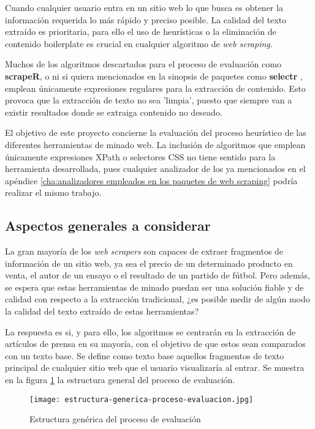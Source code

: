 Cuando cualquier usuario entra en un sitio web lo que busca es obtener la información requerida lo más
rápido y preciso posible. La calidad del texto extraído es prioritaria, para ello el uso de heurísticas o
la eliminación de contenido boilerplate es crucial en cualquier algoritmo de \emph{web scraping}.

Muchos de los algoritmos descartados para el proceso de evaluación como \textbf{scrapeR}, o ni si quiera 
mencionados en la sinopsis de paquetes como \textbf{selectr} \cite{selectr}, emplean únicamente expresiones 
regulares para la extracción de contenido. Esto provoca que la extracción de texto no sea 'limpia', puesto 
que siempre van a existir resultados donde se extraiga contenido no deseado.

El objetivo de este proyecto concierne la evaluación del proceso heurístico de las diferentes herramientas
de minado web. La inclusión de algoritmos que emplean únicamente expresiones XPath o selectores CSS no
tiene sentido para la herramienta desarrollada, pues cualquier analizador de los ya mencionados en el
apéndice \ref{cha:analizadores empleados en los paquetes de web scraping} podría realizar el mismo trabajo.

\subsection{Aspectos generales a considerar}
\label{subsec:aspectos generales a considerar}

La gran mayoría de los \emph{web scrapers} son capaces de extraer fragmentos de información de un sitio
web, ya sea el precio de un determinado producto en venta, el autor de un ensayo o el resultado de un 
partido de fútbol. Pero además, se espera que estas herramientas de minado puedan ser una solución fiable 
y de calidad con respecto a la extracción tradicional, ¿es posible medir de algún modo la calidad del texto 
extraído de estas herramientas?

La respuesta es si, y para ello, los algoritmos se centrarán en la extracción de artículos de prensa en su
mayoría, con el objetivo de que estos sean comparados con un texto base. Se define como texto base aquellos 
fragmentos de texto principal de cualquier sitio web que el usuario visualizaría al entrar. Se muestra en 
la figura \ref{img:estructura generica del proceso de evaluacion} la estructura general del proceso de 
evaluación.

\begin{figure}[tphb]
  \centering
  \texttt{[image: estructura-generica-proceso-evaluacion.jpg]}
  \caption{Estructura genérica del proceso de evaluación}
  \label{img:estructura generica del proceso de evaluacion}
\end{figure}

